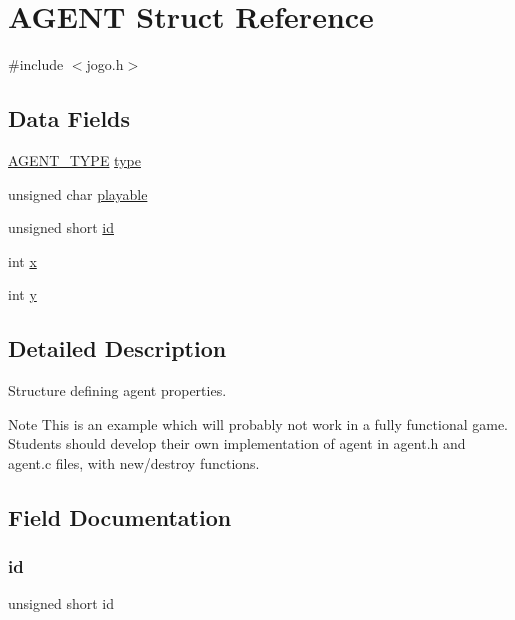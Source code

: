 \hypertarget{struct_a_g_e_n_t}{}\section{A\+G\+E\+NT Struct Reference}
\label{struct_a_g_e_n_t}


{\ttfamily \#include $<$jogo.\+h$>$}

\subsection*{Data Fields}
\begin{DoxyCompactItemize}
\item 
\mbox{\hyperlink{showworld_8h_a24d5ee52bdf31f4727c9b550d6e361ae}{A\+G\+E\+N\+T\+\_\+\+T\+Y\+PE}} \mbox{\hyperlink{struct_a_g_e_n_t_aa67ea80f7f0c5d71eaa7fe3ce7d31cc9}{type}}
\item 
unsigned char \mbox{\hyperlink{struct_a_g_e_n_t_a63b583a476b62c88c27c5cfc6ee64e41}{playable}}
\item 
unsigned short \mbox{\hyperlink{struct_a_g_e_n_t_a2e74aff868562e644e5d582929433363}{id}}
\item 
int \mbox{\hyperlink{struct_a_g_e_n_t_a6150e0515f7202e2fb518f7206ed97dc}{x}}
\item 
int \mbox{\hyperlink{struct_a_g_e_n_t_a0a2f84ed7838f07779ae24c5a9086d33}{y}}
\end{DoxyCompactItemize}


\subsection{Detailed Description}
Structure defining agent properties.

\begin{DoxyNote}{Note}
This is an example which will probably not work in a fully functional game. Students should develop their own implementation of agent in agent.\+h and agent.\+c files, with new/destroy functions. 
\end{DoxyNote}


\subsection{Field Documentation}
\mbox{\label{struct_a_g_e_n_t_a2e74aff868562e644e5d582929433363}} 
\subsubsection{\texorpdfstring{id}{id}}
{\footnotesize\ttfamily unsigned short id}

